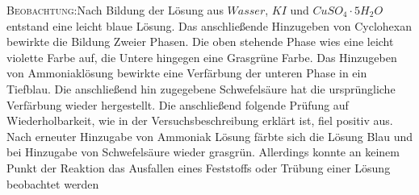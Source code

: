 \documentclass[12pt, a4paper]{article}
\begin{document}
\textsc{Beobachtung:}\hspace{5mm}Nach Bildung der Lösung aus $Wasser$, $KI$ und $CuSO_4 \cdot 5H_2O$ entstand eine leicht blaue Lösung. Das anschließende Hinzugeben von Cyclohexan bewirkte die Bildung Zweier Phasen. Die oben stehende Phase wies eine leicht violette Farbe auf, die Untere hingegen eine Grasgrüne Farbe. Das Hinzugeben von Ammoniaklösung bewirkte eine Verfärbung der unteren Phase in ein Tiefblau. Die anschließend hin zugegebene Schwefelsäure hat die ursprüngliche Verfärbung wieder hergestellt. Die anschließend folgende Prüfung auf Wiederholbarkeit, wie in der Versuchsbeschreibung erklärt ist, fiel positiv aus. Nach erneuter Hinzugabe von Ammoniak Lösung färbte sich die Lösung Blau und bei Hinzugabe von Schwefelsäure wieder grasgrün. Allerdings konnte an keinem Punkt der Reaktion das Ausfallen eines Feststoffs oder Trübung einer Lösung beobachtet werden\\
\end{document}
